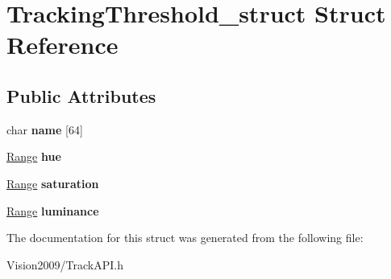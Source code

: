 \hypertarget{structTrackingThreshold__struct}{
\section{TrackingThreshold\_\-struct Struct Reference}
\label{structTrackingThreshold__struct}
}
\subsection*{Public Attributes}
\begin{DoxyCompactItemize}
\item 
\hypertarget{structTrackingThreshold__struct_a46cdf8012a212dcfa9ccf6b0155ef1ef}{
char {\bfseries name} \mbox{[}64\mbox{]}}
\label{structTrackingThreshold__struct_a46cdf8012a212dcfa9ccf6b0155ef1ef}

\item 
\hypertarget{structTrackingThreshold__struct_a9825b2e085e8e33b82177ddb9978387c}{
\hyperlink{structRange__struct}{Range} {\bfseries hue}}
\label{structTrackingThreshold__struct_a9825b2e085e8e33b82177ddb9978387c}

\item 
\hypertarget{structTrackingThreshold__struct_a7086ccd8d5c8339d589f295df7a6382d}{
\hyperlink{structRange__struct}{Range} {\bfseries saturation}}
\label{structTrackingThreshold__struct_a7086ccd8d5c8339d589f295df7a6382d}

\item 
\hypertarget{structTrackingThreshold__struct_a7573d77c9a67e727145d5de4d525323c}{
\hyperlink{structRange__struct}{Range} {\bfseries luminance}}
\label{structTrackingThreshold__struct_a7573d77c9a67e727145d5de4d525323c}

\end{DoxyCompactItemize}


The documentation for this struct was generated from the following file:\begin{DoxyCompactItemize}
\item 
Vision2009/TrackAPI.h\end{DoxyCompactItemize}
